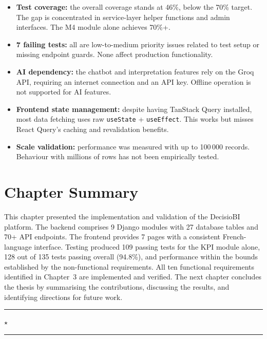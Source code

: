 \begin{itemize}
  \setlength\itemsep{0.25cm}

  \item[\textcolor{BITred}{\textbullet}]
  \textbf{Test coverage:} the overall coverage
  stands at 46\%, below the 70\% target.
  The gap is concentrated in service-layer helper
  functions and admin interfaces.
  The M4 module alone achieves 70\%+.

  \item[\textcolor{BITred}{\textbullet}]
  \textbf{7 failing tests:} all are low-to-medium priority
  issues related to test setup or missing endpoint guards.
  None affect production functionality.

  \item[\textcolor{BITred}{\textbullet}]
  \textbf{AI dependency:} the chatbot and interpretation
  features rely on the Groq API,
  requiring an internet connection and an API key.
  Offline operation is not supported for AI features.

  \item[\textcolor{BITred}{\textbullet}]
  \textbf{Frontend state management:} despite having
  TanStack Query installed, most data fetching
  uses raw \texttt{useState} + \texttt{useEffect}.
  This works but misses React Query's
  caching and revalidation benefits.

  \item[\textcolor{BITred}{\textbullet}]
  \textbf{Scale validation:} performance was measured
  with up to 100\,000 records.
  Behaviour with millions of rows
  has not been empirically tested.
\end{itemize}


\section{Chapter Summary}

\noindent
This chapter presented the implementation
and validation of the DecisioBI platform.
The backend comprises 9 Django modules
with 27 database tables and 70+ API endpoints.
The frontend provides 7 pages
with a consistent French-language interface.
Testing produced 109 passing tests
for the KPI module alone,
128 out of 135 tests passing overall (94.8\%),
and performance within the bounds
established by the non-functional requirements.
All ten functional requirements
identified in Chapter~3 are implemented
and verified.
The next chapter concludes the thesis
by summarising the contributions,
discussing the results,
and identifying directions for future work.

\vspace{0.7cm}
\begin{center}
  \textcolor{BITred!40}{\rule{0.35\linewidth}{0.5pt}}
  \hspace{0.5em}
  \textcolor{BITred}{$\star$}
  \hspace{0.5em}
  \textcolor{BITred!40}{\rule{0.35\linewidth}{0.5pt}}
\end{center}
